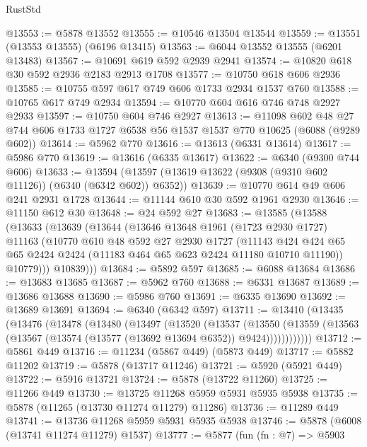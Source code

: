 \begin{lexlean}{RustStd}
\begin{coremodule}
@13553 := @5878 @13552
@13555 := @10546 @13504 @13544
@13559 := @13551 (@13553 @13555) (@6196 @13415)
@13563 := @6044 @13552 @13555 (@6201 @13483)
@13567 := @10691 @619 @592 @2939 @2941
@13574 := @10820 @618 @30 @592 @2936 @2183 @2913 @1708
@13577 := @10750 @618 @606 @2936
@13585 := @10755 @597 @617 @749 @606 @1733 @2934 @1537 @760
@13588 := @10765 @617 @749 @2934
@13594 := @10770 @604 @616 @746 @748 @2927 @2933
@13597 := @10750 @604 @746 @2927
@13613 := @11098
    @602
    @48
    @27
    @744
    @606
    @1733
    @1727
    @6538
    @56
    @1537
    @1537
    @770
    @10625
    (@6088 (@9289 @602))
@13614 := @5962 @770
@13616 := @13613 (@6331 @13614)
@13617 := @5986 @770
@13619 := @13616 (@6335 @13617)
@13622 := @6340 (@9300 @744 @606)
@13633 := @13594 (@13597 (@13619 @13622 (@9308 (@9310 @602 @11126)) (@6340 (@6342 @602)) @6352))
@13639 := @10770 @614 @49 @606 @241 @2931 @1728
@13644 := @11144 @610 @30 @592 @1961 @2930
@13646 := @11150 @612 @30
@13648 := @24 @592 @27
@13683 := @13585
    (@13588
      (@13633
        (@13639
          (@13644
            (@13646
              @13648
              @1961
              (@1723 @2930 @1727)
              @11163
              (@10770
                @610
                @48
                @592
                @27
                @2930
                @1727
                (@11143
                  @424
                  @424
                  @65
                  @65
                  @2424
                  @2424
                  (@11183 @464 @65 @623 @2424 @11180 @10710 @11190))
                @10779)))
          @10839)))
@13684 := @5892 @597
@13685 := @6088 @13684
@13686 := @13683 @13685
@13687 := @5962 @760
@13688 := @6331 @13687
@13689 := @13686 @13688
@13690 := @5986 @760
@13691 := @6335 @13690
@13692 := @13689 @13691
@13694 := @6340 (@6342 @597)
@13711 := @13410
    (@13435
      (@13476
        (@13478
          (@13480
            (@13497
              (@13520
                (@13537
                  (@13550
                    (@13559 (@13563 (@13567 (@13574 (@13577 (@13692 @13694 @6352)) @9424))))))))))))
@13712 := @5861 @449
@13716 := @11234 (@5867 @449) (@5873 @449)
@13717 := @5882 @11202
@13719 := @5878 (@13717 @11246)
@13721 := @5920 (@5921 @449)
@13722 := @5916 @13721
@13724 := @5878 (@13722 @11260)
@13725 := @11266 @449
@13730 := @13725 @11268 @5959 @5931 @5935 @5938
@13735 := @5878 (@11265 (@13730 @11274 @11279) @11286)
@13736 := @11289 @449
@13741 := @13736 @11268 @5959 @5931 @5935 @5938
@13746 := @5878 (@6008 (@13741 @11274 @11279) @1537)
@13777 := @5877
    (fun (fn : @7) =>
    @5903

\end{coremodule}
\end{lexlean}
